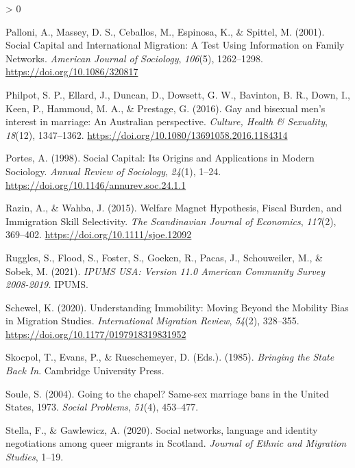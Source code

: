\documentclass[
  11pt,
]{article}
\newlength{\cslhangindent}
\newenvironment{CSLReferences}[2] %
 {%
  \setlength{\parindent}{0pt}
  \ifodd #1 \everypar{\setlength{\hangindent}{\cslhangindent}}\ignorespaces\fi
  \ifnum #2 > 0
  \setlength{\parskip}{#2\baselineskip}
  \fi
 }%
 {}
\begin{document}
\begin{CSLReferences}{1}{0}
\leavevmode\hypertarget{ref-palloni_2001}{}%
Palloni, A., Massey, D. S., Ceballos, M., Espinosa, K., \& Spittel, M. (2001). Social {Capital} and {International Migration}: {A Test Using Information} on {Family Networks}. \emph{American Journal of Sociology}, \emph{106}(5), 1262--1298. \url{https://doi.org/10.1086/320817}

\leavevmode\hypertarget{ref-philpot_2016_gay}{}%
Philpot, S. P., Ellard, J., Duncan, D., Dowsett, G. W., Bavinton, B. R., Down, I., Keen, P., Hammoud, M. A., \& Prestage, G. (2016). Gay and bisexual men's interest in marriage: An {Australian} perspective. \emph{Culture, Health \& Sexuality}, \emph{18}(12), 1347--1362. \url{https://doi.org/10.1080/13691058.2016.1184314}

\leavevmode\hypertarget{ref-portes_1998}{}%
Portes, A. (1998). Social {Capital}: {Its Origins} and {Applications} in {Modern Sociology}. \emph{Annual Review of Sociology}, \emph{24}(1), 1--24. \url{https://doi.org/10.1146/annurev.soc.24.1.1}

\leavevmode\hypertarget{ref-razin_2015}{}%
Razin, A., \& Wahba, J. (2015). Welfare {Magnet Hypothesis}, {Fiscal Burden}, and {Immigration Skill Selectivity}. \emph{The Scandinavian Journal of Economics}, \emph{117}(2), 369--402. \url{https://doi.org/10.1111/sjoe.12092}

\leavevmode\hypertarget{ref-ruggles_2021}{}%
Ruggles, S., Flood, S., Foster, S., Goeken, R., Pacas, J., Schouweiler, M., \& Sobek, M. (2021). \emph{{IPUMS USA}: {Version} 11.0 {American Community Survey} 2008-2019.} {IPUMS}.

\leavevmode\hypertarget{ref-schewel_2020}{}%
Schewel, K. (2020). Understanding {Immobility}: {Moving Beyond} the {Mobility Bias} in {Migration Studies}. \emph{International Migration Review}, \emph{54}(2), 328--355. \url{https://doi.org/10.1177/0197918319831952}

\leavevmode\hypertarget{ref-skocpol_1985}{}%
Skocpol, T., Evans, P., \& Rueschemeyer, D. (Eds.). (1985). \emph{Bringing the {State Back In}}. {Cambridge University Press}.

\leavevmode\hypertarget{ref-soule_2004}{}%
Soule, S. (2004). Going to the chapel? {Same}-sex marriage bans in the {United States}, 1973{}. \emph{Social Problems}, \emph{51}(4), 453--477.

\leavevmode\hypertarget{ref-stella_2020}{}%
Stella, F., \& Gawlewicz, A. (2020). Social networks, language and identity negotiations among queer migrants in {Scotland}. \emph{Journal of Ethnic and Migration Studies}, 1--19.


\end{CSLReferences}
\end{document}

